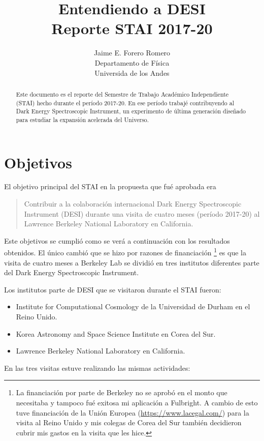 \documentclass[12pt,spanish]{article}
\title{{\sc Entendiendo a DESI}\\{\small\sc Reporte STAI 2017-20}}
\author{Jaime E. Forero Romero\\Departamento de F\'isica\\Universida
  de los Andes}
\begin{document}
\maketitle
\begin{abstract}
Este documento es el reporte del Semestre de Trabajo Acad\'emico
Independiente (STAI) hecho durante el per\'iodo 2017-20. 
En ese per\'iodo trabaj\'e contribuyendo al Dark Energy Spectroscopic
Instrument, un experimento de \'ultima generaci\'on dise\~nado para
estudiar la expansi\'on acelerada del Universo.
\end{abstract}

\section{Objetivos}

El objetivo principal del STAI en la propuesta que fu\'e aprobada era 
\begin{quote}
Contribuir a la colaboraci\'on internacional Dark Energy Spectroscopic
Instrument (DESI) durante una visita de cuatro meses (per\'iodo
2017-20) al Lawrence Berkeley National Laboratory en California.  
\end{quote}

Este objetivos se cumpli\'o como se ver\'a a continuaci\'on con los
resultados obtenidos.
El \'unico cambi\'o que se hizo por razones de
financiaci\'on \footnote{La financiaci\'on por parte de Berkeley no se
  aprob\'o en el monto que necesitaba y tampoco fu\'e exitosa mi
  aplicaci\'on a Fulbright. A cambio de esto tuve
  financiaci\'on de la Uni\'on Europea (\url{https://www.lacegal.com/})
  para la visita al Reino Unido y mis colegas de Corea del Sur
  tambi\'en decidieron cubrir mis gastos en la visita que les hice.}
es que la visita de cuatro meses a Berkeley Lab se dividi\'o en tres
institutos diferentes parte del Dark Energy Spectroscopic Instrument.   


Los institutos parte de DESI que se visitaron durante el STAI fueron:
\begin{itemize}
\item{Institute for Computational Cosmology de la Universidad de
  Durham en el Reino Unido.}
\item{Korea Astronomy and Space Science Institute en Corea del Sur.}
\item{Lawrence Berkeley National Laboratory en California.}
\end{itemize}

En las tres visitas estuve realizando las mismas actividades:
\end{document}
